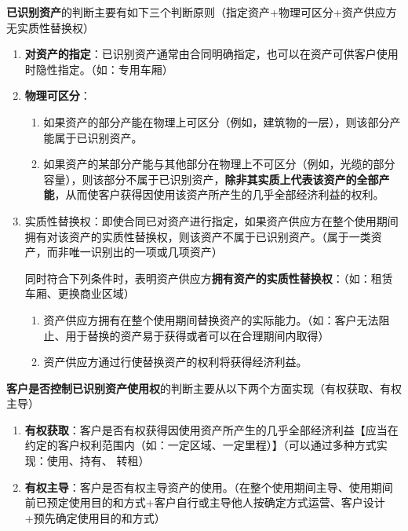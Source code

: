 \documentclass[UTF8,12pt]{ctexart}
\numberwithin{equation}{section} %
\numberwithin{figure}{section}
\numberwithin{table}{section}
\begin{document}
	\textbf{已识别资产}的判断主要有如下三个判断原则（指定资产+物理可区分+资产供应方无实质性替换权）
	\begin{enumerate}
		
		\item \textbf{对资产的指定}：已识别资产通常由合同明确指定，也可以在资产可供客户使用时隐性指定。（如：专用车厢）
		
		\item \textbf{物理可区分}：
		\begin{enumerate}
			\item 如果资产的部分产能在物理上可区分（例如，建筑物的一层），则该部分产能属于已识别资产。
			
			\item 如果资产的某部分产能与其他部分在物理上不可区分（例如，光缆的部分容量），则该部分不属于已识别资产，\textbf{除非其实质上代表该资产的全部产能}，从而使客户获得因使用该资产所产生的几乎全部经济利益的权利。
		\end{enumerate}
		
		\item 实质性替换权：即使合同已对资产进行指定，如果资产供应方在整个使用期间拥有对该资产的实质性替换权，则该资产不属于已识别资产。（属于一类资产，而非唯一识别出的一项或几项资产）
			
		同时符合下列条件时，表明资产供应方\textbf{拥有资产的实质性替换权}：（如：租赁车厢、更换商业区域）
		\begin{enumerate}
			\item 资产供应方拥有在整个使用期间替换资产的实际能力。（如：客户无法阻止、用于替换的资产易于获得或者可以在合理期间内取得）
			
			\item 资产供应方通过行使替换资产的权利将获得经济利益。
		\end{enumerate}
		
	\end{enumerate}
	
	\textbf{客户是否控制已识别资产使用权}的判断主要从以下两个方面实现（有权获取、有权主导）
	\begin{enumerate}
		\item \textbf{有权获取}：客户是否有权获得因使用资产所产生的几乎全部经济利益【应当在约定的客户权利范围内（如：一定区域、一定里程）】（可以通过多种方式实现：使用、持有、
		转租）
		
		\item \textbf{有权主导}：客户是否有权主导资产的使用。（在整个使用期间主导、使用期间前已预定使用目的和方式+客户自行或主导他人按确定方式运营、客户设计+预先确定使用目的和方式）
	\end{enumerate}
\end{document}
